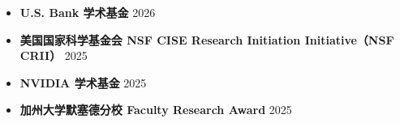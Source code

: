 \begin{itemize}
  \item \textbf{U.S. Bank 学术基金} \hfill 2026
  \item \textbf{美国国家科学基金会 NSF CISE Research Initiation Initiative（NSF CRII）} \hfill 2025
  \item \textbf{NVIDIA 学术基金} \hfill 2025
  \item \textbf{加州大学默塞德分校 Faculty Research Award} \hfill 2025
\end{itemize}
